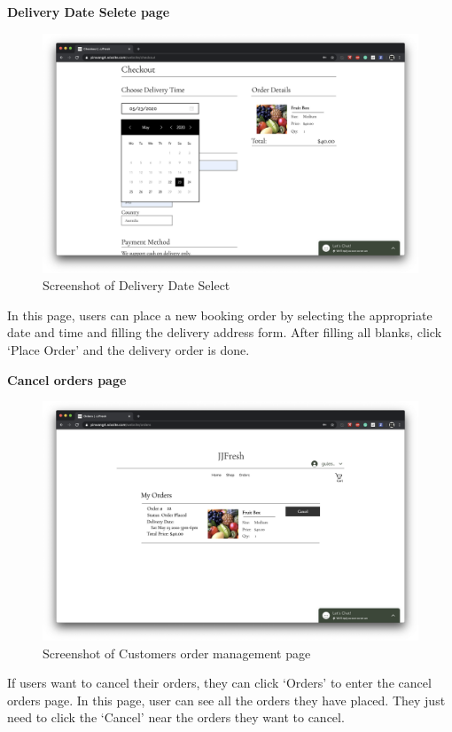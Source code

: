 \clearpage
\textbf{Delivery Date Selete page}
\begin{figure}[htp]
\centering
\includegraphics[width=\textwidth]{Figures/dateSelect.png}
\caption{Screenshot of Delivery Date Select}
\label{fig:dateSelect}
\end{figure}

In this page, users can place a new booking order by selecting the appropriate date and time and filling the delivery address form. After filling all blanks, click ‘Place Order’ and the delivery order is done.

\clearpage
\textbf{Cancel orders page}
\begin{figure}[htp]
\centering
\includegraphics[width=\textwidth]{Figures/customerOrder.png}
\caption{Screenshot of Customers order management page}
\label{fig:customerOrder}
\end{figure}

If users want to cancel their orders, they can click ‘Orders’ to enter the cancel orders page. In this page, user can see all the orders they have placed. They just need to click the ‘Cancel’ near the orders they want to cancel.

